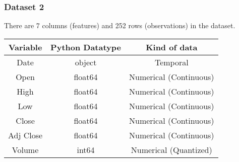 \documentclass[12pt]{article}
\begin{document}
\subsubsection*{Dataset 2}
There are 7 columns (features) and 252 rows (observations) in the dataset.
\begin{center}
    \begin{tabular}{ |c|c|c|}
    \hline
    Variable & Python Datatype & Kind of data \\
    \hline
    Date         & object & Temporal\\
    Open        & float64 & Numerical (Continuous)\\
    High        & float64 & Numerical (Continuous)\\
    Low         & float64 & Numerical (Continuous)\\
    Close       & float64 & Numerical (Continuous)\\
    Adj Close   & float64 & Numerical (Continuous)\\
    Volume      &   int64 & Numerical (Quantized) \\
    \hline
    \end{tabular}
\end{center}
\end{document}
